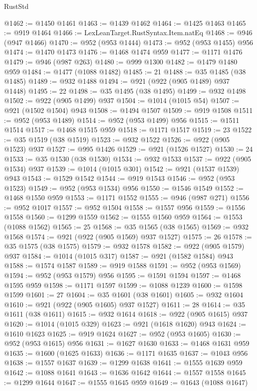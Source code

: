 \begin{lexlean}{RustStd}
\begin{coremodule}
@1462 := @1450 @1461
@1463 := @1439 @1462
@1464 := @1425 @1463
@1465 := @919 @1464
@1466 := LexLeanTarget.RustSyntax.Item.natEq
@1468 := @946 (@947 @1466)
@1470 := @952 (@953 @1444)
@1473 := @952 (@953 @1455) @956
@1474 := @1470 @1473
@1476 := @1468 @1474 @959
@1477 := @1171 @1476
@1479 := @946 (@987 @263)
@1480 := @999 @1300
@1482 := @1479 @1480 @959
@1484 := @1477 (@1088 @1482)
@1485 := 21
@1488 := @35 @1485 (@38 @1485)
@1489 := @932 @1488
@1494 := @921 (@922 (@905 @1489) @937 @1448)
@1495 := 22
@1498 := @35 @1495 (@38 @1495)
@1499 := @932 @1498
@1502 := @922 (@905 @1499) @937
@1504 := @1014 (@1015 @54)
@1507 := @921 (@1502 @1504) @943
@1508 := @1494 @1507
@1509 := @919 @1508
@1511 := @952 (@953 @1489)
@1514 := @952 (@953 @1499) @956
@1515 := @1511 @1514
@1517 := @1468 @1515 @959
@1518 := @1171 @1517
@1519 := 23
@1522 := @35 @1519 (@38 @1519)
@1523 := @932 @1522
@1526 := @922 (@905 @1523) @937
@1527 := @995 @1426
@1529 := @921 (@1526 @1527)
@1530 := 24
@1533 := @35 @1530 (@38 @1530)
@1534 := @932 @1533
@1537 := @922 (@905 @1534) @937
@1539 := @1014 (@1015 @301)
@1542 := @921 (@1537 @1539) @943
@1543 := @1529 @1542
@1544 := @919 @1543
@1546 := @952 (@953 @1523)
@1549 := @952 (@953 @1534) @956
@1550 := @1546 @1549
@1552 := @1468 @1550 @959
@1553 := @1171 @1552
@1555 := @946 (@987 @271)
@1556 := @952 @1017
@1557 := @952 @1504
@1558 := @1557 @956
@1559 := @1556 @1558
@1560 := @1299 @1559
@1562 := @1555 @1560 @959
@1564 := @1553 (@1088 @1562)
@1565 := 25
@1568 := @35 @1565 (@38 @1565)
@1569 := @932 @1568
@1574 := @921 (@922 (@905 @1569) @937 @1527)
@1575 := 26
@1578 := @35 @1575 (@38 @1575)
@1579 := @932 @1578
@1582 := @922 (@905 @1579) @937
@1584 := @1014 (@1015 @317)
@1587 := @921 (@1582 @1584) @943
@1588 := @1574 @1587
@1589 := @919 @1588
@1591 := @952 (@953 @1569)
@1594 := @952 (@953 @1579) @956
@1595 := @1591 @1594
@1597 := @1468 @1595 @959
@1598 := @1171 @1597
@1599 := @1088 @1239
@1600 := @1598 @1599
@1601 := 27
@1604 := @35 @1601 (@38 @1601)
@1605 := @932 @1604
@1610 := @921 (@922 (@905 @1605) @937 @1527)
@1611 := 28
@1614 := @35 @1611 (@38 @1611)
@1615 := @932 @1614
@1618 := @922 (@905 @1615) @937
@1620 := @1014 (@1015 @329)
@1623 := @921 (@1618 @1620) @943
@1624 := @1610 @1623
@1625 := @919 @1624
@1627 := @952 (@953 @1605)
@1630 := @952 (@953 @1615) @956
@1631 := @1627 @1630
@1633 := @1468 @1631 @959
@1635 := @1600 (@1625 @1633)
@1636 := @1171 @1635
@1637 := @1043 @956
@1638 := @1557 @1637
@1639 := @1299 @1638
@1641 := @1555 @1639 @959
@1642 := @1088 @1641
@1643 := @1636 @1642
@1644 := @1557 @1558
@1645 := @1299 @1644
@1647 := @1555 @1645 @959
@1649 := @1643 (@1088 @1647)

\end{coremodule}
\end{lexlean}
